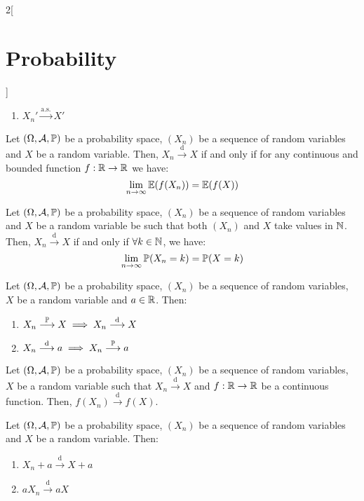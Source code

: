 \documentclass[../../../main.tex]{subfiles}
\begin{document}
\begin{multicols}{2}[\section{Probability}]
\begin{theorem}
\begin{enumerate}
      \item ${X_n'}\overset{\text{a.s.}}{\longrightarrow}X'$
    \end{enumerate}
  \end{theorem}
  \begin{theorem}
    Let $(\Omega,\mathcal{A},\mathbb{P})$ be a probability space, $(X_n)$ be a sequence of random variables and $X$ be a random variable. Then, $X_n\overset{\text{d}}{\longrightarrow} X$ if and only if for any continuous and bounded function $f:\mathbb{R}\rightarrow\mathbb{R}$ we have: $$\lim_{n\to\infty}\mathbb{E}(f(X_n))=\mathbb{E}(f(X))$$
  \end{theorem}
  \begin{lemma}
    Let $(\Omega,\mathcal{A},\mathbb{P})$ be a probability space, $(X_n)$ be a sequence of random variables and $X$ be a random variable be such that both $(X_n)$ and $X$ take values in $\mathbb{N}$. Then, $X_n\overset{\text{d}}{\longrightarrow} X$ if and only if $\forall k\in\mathbb{N}$, we have: $$\lim_{n\to\infty} \mathbb{P}(X_n=k)=\mathbb{P}(X=k)$$
  \end{lemma}
  \begin{proposition}
    Let $(\Omega,\mathcal{A},\mathbb{P})$ be a probability space, $(X_n)$ be a sequence of random variables, $X$ be a random variable and $a\in\mathbb{R}$. Then:
    \begin{enumerate}
      \item $X_n\overset{\mathbb{P}}{\longrightarrow} X\implies X_n\overset{\text{d}}{\longrightarrow} X$
      \item $X_n\overset{\text{d}}{\longrightarrow} a\implies X_n\overset{\mathbb{P}}{\longrightarrow} a$
    \end{enumerate}
  \end{proposition}
  \begin{proposition}
    Let $(\Omega,\mathcal{A},\mathbb{P})$ be a probability space, $(X_n)$ be a sequence of random variables, $X$ be a random variable such that $X_n\overset{\text{d}}{\longrightarrow} X$ and $f:\mathbb{R}\rightarrow\mathbb{R}$ be a continuous function. Then, $f(X_n)\overset{\text{d}}{\longrightarrow}f(X)$.
  \end{proposition}
  \begin{corollary}
    Let $(\Omega,\mathcal{A},\mathbb{P})$ be a probability space, $(X_n)$ be a sequence of random variables and $X$ be a random variable. Then:
    \begin{enumerate}
      \item $X_n+a\overset{\text{d}}{\longrightarrow}X+a$
      \item $aX_n\overset{\text{d}}{\longrightarrow}aX$

\end{enumerate}
\end{corollary}
\end{multicols}
\end{document}
